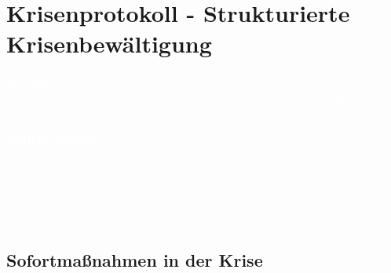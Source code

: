 
\section{Krisenprotokoll - Strukturierte Krisenbewältigung}
\label{sec:krisenprotokoll}

\begin{ctmmRedBox}[title=\textcolor{white}{CTMM Krisenprotokoll v5.5}]

\textcolor{white}{\textbf{Wichtig:} Dieses Protokoll dient der strukturierten Dokumentation und Nachbereitung von Krisensituationen. Es ersetzt NICHT professionelle Hilfe in akuten Notfällen.}

\vspace{0.5em}

\textcolor{white}{\textbf{Notfallnummern:}}
\begin{itemize}
    \item[\textcolor{white}{•}] \textcolor{white}{Rettungsdienst: 112}
    \item[\textcolor{white}{•}] \textcolor{white}{Krisentelefon: 0800 111 0 111}  
    \item[\textcolor{white}{•}] \textcolor{white}{Therapeut/in: \TextField[name=crisis_therapist_number,width=6cm,height=1em,bordercolor={1 1 1},backgroundcolor={0.9 0.9 0.9}]{}}
\end{itemize}

\end{ctmmRedBox}

\subsection{Sofortmaßnahmen in der Krise}

